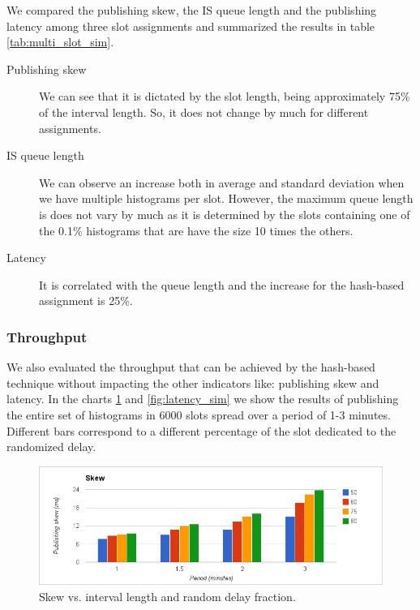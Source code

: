 We compared the publishing skew, the IS queue length and the publishing latency among three slot assignments and summarized the results in table \ref{tab:multi_slot_sim}. 
\begin{description}
\item[Publishing skew] We can see that it is dictated by the slot length, being approximately 75\% of the interval length. So, it does not change by much for different assignments.

\item[IS queue length]
We can observe an increase both in average and standard deviation when we have multiple histograms per slot. However, the maximum queue length is does not vary by much as it is determined by the slots containing one of the 0.1\% histograms that are have the size 10 times the others. 

\item[Latency]
It is correlated with the queue length and the increase for the hash-based assignment is 25\%.
\end{description}


\subsubsection*{Throughput}

We also evaluated the throughput that can be achieved by the hash-based technique without impacting the other indicators like: publishing skew and latency. In the charts \ref{fig:skew_sim} and \ref{fig:latency_sim} we show the results of publishing the entire set of histograms in 6000 slots spread over a period of 1-3 minutes. Different bars correspond to a different percentage of the slot dedicated to the randomized delay.

\begin{figure}[ht]
\centering
\includegraphics[scale=0.5]{Images/skew_sim.png}
\caption{Skew vs. interval length and random delay fraction.}
\label{fig:skew_sim}
\end{figure}

